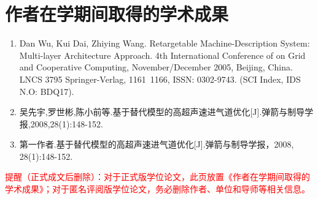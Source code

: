 %

\chapter*{作者在学期间取得的学术成果}

    \begin{enumerate}
        \item Dan Wu, Kui Dai, Zhiying Wang. Retargetable Machine-Description System: Multi-layer Architecture Approach. 4th International Conference of on Grid and Cooperative Computing, November/December 2005, Beijing, China. LNCS 3795 Springer-Verlag, 1161~1166, ISSN: 0302-9743. (SCI Index, IDS N.O: BDQ17).
        \item 吴先宇,罗世彬,陈小前等.基于替代模型的高超声速进气道优化[J].弹箭与制导学报,2008,28(1):148-152.
        \item 第一作者.基于替代模型的高超声速进气道优化[J].弹箭与制导学报，2008, 28(1):148-152.
    \end{enumerate}

    
\par\textcolor{red}{提醒（正式成文后删除）：对于正式版学位论文，此页放置《作者在学期间取得的学术成果》；对于匿名评阅版学位论文，务必删除作者、单位和导师等相关信息。}
